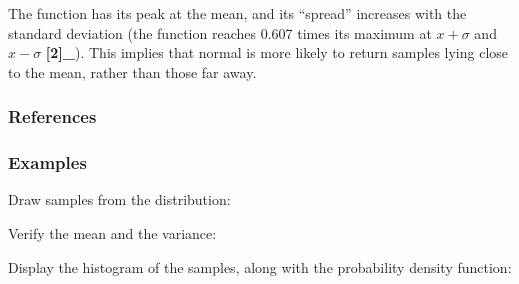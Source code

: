 \documentclass[letterpaper,10pt,english]{sphinxmanual}
\begin{document}
\begin{fulllineitems}
\sphinxAtStartPar
The function has its peak at the mean, and its “spread” increases with
the standard deviation (the function reaches 0.607 times its maximum at
\(x + \sigma\) and \(x - \sigma\) {\color{red}\bfseries{}{[}2{]}\_}).  This implies that
normal is more likely to return samples lying close to the mean, rather
than those far away.
\subsubsection*{References}
\subsubsection*{Examples}

\sphinxAtStartPar
Draw samples from the distribution:

\begin{sphinxVerbatim}[commandchars=\\\{\}]
     
    
\end{sphinxVerbatim}

\sphinxAtStartPar
Verify the mean and the variance:

\begin{sphinxVerbatim}[commandchars=\\\{\}]
  
\end{sphinxVerbatim}

\begin{sphinxVerbatim}[commandchars=\\\{\}]
   
\end{sphinxVerbatim}

\sphinxAtStartPar
Display the histogram of the samples, along with
the probability density function:


\end{fulllineitems}
\end{document}
